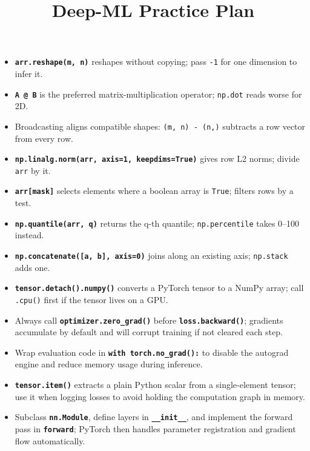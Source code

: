 \documentclass{article}
\title{Deep-ML Practice Plan}
\author{}
\date{}
\begin{document}
\maketitle

\begin{itemize}
    \item \textbf{\texttt{arr.reshape(m, n)}} reshapes without copying; pass \texttt{-1} for one dimension to infer it.

    \item \textbf{\texttt{A @ B}} is the preferred matrix-multiplication operator; \texttt{np.dot} reads worse for 2D.

    \item Broadcasting aligns compatible shapes: \texttt{(m,\,n) - (n,)} subtracts a row vector from every row.

    \item \textbf{\texttt{np.linalg.norm(arr, axis=1, keepdims=True)}} gives row L2 norms; divide \texttt{arr} by it.

    \item \textbf{\texttt{arr[mask]}} selects elements where a boolean array is \texttt{True}; filters rows by a test.

    \item \textbf{\texttt{np.quantile(arr, q)}} returns the q-th quantile; \texttt{np.percentile} takes 0--100 instead.

    \item \textbf{\texttt{np.concatenate([a, b], axis=0)}} joins along an existing axis; \texttt{np.stack} adds one.

    \item \textbf{\texttt{tensor.detach().numpy()}} converts a PyTorch tensor to a NumPy array; call \texttt{.cpu()} first if the tensor lives on a GPU.

    \item Always call \textbf{\texttt{optimizer.zero\_grad()}} before \textbf{\texttt{loss.backward()}}; gradients accumulate by default and will corrupt training if not cleared each step.

    \item Wrap evaluation code in \textbf{\texttt{with torch.no\_grad():}} to disable the autograd engine and reduce memory usage during inference.

    \item \textbf{\texttt{tensor.item()}} extracts a plain Python scalar from a single-element tensor; use it when logging losses to avoid holding the computation graph in memory.

    \item Subclass \textbf{\texttt{nn.Module}}, define layers in \textbf{\texttt{\_\_init\_\_}}, and implement the forward pass in \textbf{\texttt{forward}}; PyTorch then handles parameter registration and gradient flow automatically.

\end{itemize}
\end{document}
